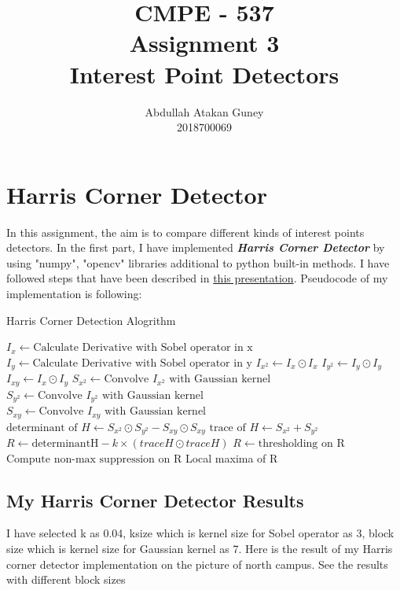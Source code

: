 \documentclass[12pt]{article}
\title{CMPE - 537 \\ Assignment 3 \\ Interest Point Detectors}
\author{Abdullah Atakan Guney \\ 2018700069}
\begin{document}
 
 
 
\maketitle

\newpage

\tableofcontents

\newpage

\section{Harris Corner Detector}
In this assignment, the aim is to compare different kinds of interest points detectors. In the first part, I have implemented \textbf{\textit{Harris Corner Detector}} by using "numpy", "opencv" libraries additional to python built-in methods. I have followed steps that have been described in \href{http://www.cse.psu.edu/~rtc12/CSE486/lecture06.pdf}{this presentation}.  Pseudocode of my implementation is following:

\begin{algorithm}
\caption{Harris Corner Detection Alogrithm}\label{}
\begin{algorithmic}[1]
\State $I_{x} \gets \text{Calculate Derivative with Sobel operator in x}$
\State $I_{y} \gets \text{Calculate Derivative with Sobel operator in y}$
\State $I_{x^2} \gets I_x \odot I_x$
\State $I_{y^2} \gets I_y \odot I_y$
\State $I_{xy} \gets I_x \odot I_y$
\State $S_{x^2} \gets \text{Convolve } I_{x^2} \text{ with Gaussian kernel}$
\State $S_{y^2} \gets \text{Convolve } I_{y^2} \text{ with Gaussian kernel}$
\State $S_{xy} \gets \text{Convolve } I_{xy} \text{ with Gaussian kernel}$
\State $\text{determinant of} \textit{ H} \gets S_{x^2} \odot S_{y^2} - S_{xy} \odot S_{xy}$
\State $\text{trace of } \textit{H} \gets S_{x^2} + S_{y^2}$
\State $R \gets \text{determinantH} - k \times (traceH \odot traceH)$
\State $R \gets \text{thresholding on R}$
\State $\text{Compute non-max suppression on R}$ 
\State \Return Local maxima of R
\EndProcedure
\end{algorithmic}
\end{algorithm}

\subsection{My Harris Corner Detector Results}
I have selected k as 0.04, ksize which is kernel size for Sobel operator as 3, block size which is kernel size for Gaussian kernel as 7.
Here is the result of my Harris corner detector implementation on the picture of north campus. See the results with different block sizes
\end{document}

